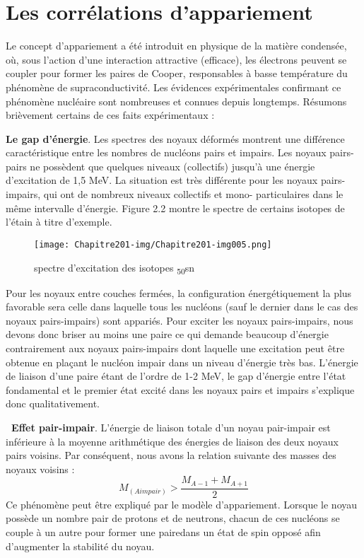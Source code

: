 \section{Les corrélations d'appariement}

Le concept d'appariement a été introduit en physique de la matière condensée, où, sous l'action d'une interaction
attractive (efficace), les électrons peuvent se coupler pour former les paires de Cooper, responsables à basse
température du phénomène de supraconductivité. Les évidences expérimentales confirmant ce phénomène nucléaire sont
nombreuses et connues depuis longtemps. Résumons brièvement certains de ces faits expérimentaux :

\textbf{Le gap d'énergie}. Les spectres des noyaux déformés montrent une différence caractéristique entre les nombres de
nucléons pairs et impairs. Les noyaux pairs-pairs ne possèdent que quelques niveaux (collectifs) jusqu'à une énergie
d'excitation de 1,5 MeV. La situation est très différente pour les noyaux pairs-impairs, qui ont de nombreux niveaux
collectifs et mono- particulaires dans le même intervalle d'énergie. Figure 2.2 montre le spectre de certains isotopes
de l'étain à titre d'exemple.


 \begin{figure}[htb]
 	\texttt{[image: Chapitre201-img/Chapitre201-img005.png]}
 	\caption{ spectre d'excitation des isotopes \textsubscript{50}sn
}
 \end{figure}

Pour les noyaux entre couches fermées, la configuration énergétiquement la plus favorable sera celle dans laquelle tous
les nucléons (sauf le dernier dans le cas des noyaux pairs-impairs) sont appariés. Pour exciter les noyaux
pairs-impairs, nous devons donc briser au moins une paire ce qui demande beaucoup d'énergie contrairement aux noyaux
pairs-impairs dont laquelle une excitation peut être obtenue en plaçant le nucléon impair dans un niveau d'énergie très
bas. L'énergie de liaison d'une paire étant de l'ordre de 1-2 MeV, le gap d'énergie entre l'état fondamental et le
premier état excité dans les noyaux pairs et impairs s'explique donc qualitativement.

\textbf{\ Effet pair-impair}. L'énergie de liaison totale d'un noyau pair-impair est inférieure à la moyenne
arithmétique des énergies de liaison des deux noyaux pairs voisins. Par conséquent, nous avons la relation suivante des
masses des noyaux voisins :
 \begin{equation}M_{\left(A\mathit{impair}\right)}>\frac{M_{A-1}+M_{A+1}}
2\end{equation}
Ce phénomène peut être expliqué par le modèle d'appariement. Lorsque le noyau possède un nombre pair de protons et de
neutrons, chacun de ces nucléons se couple à un autre pour former une pairedans un état de spin opposé afin
d'augmenter la stabilité du noyau.

